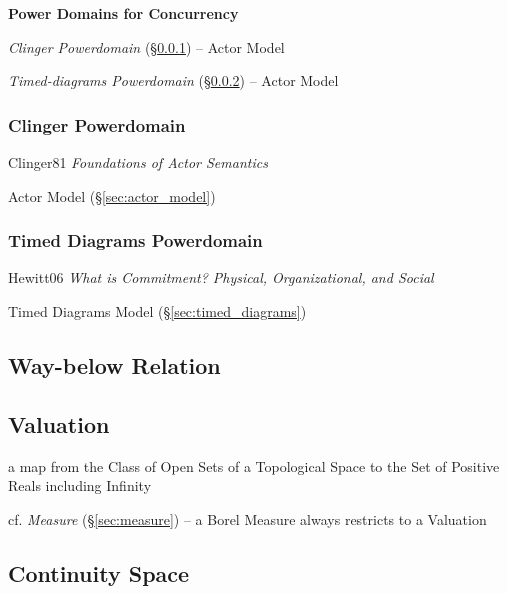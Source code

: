\textbf{Power Domains for Concurrency}

\emph{Clinger Powerdomain} (\S\ref{sec:clinger_powerdomain}) -- Actor
Model

\emph{Timed-diagrams Powerdomain}
(\S\ref{sec:timed_diagrams_powerdomain}) -- Actor Model



\subsubsection{Clinger Powerdomain}\label{sec:clinger_powerdomain}

Clinger81 \emph{Foundations of Actor Semantics}

\fist Actor Model (\S\ref{sec:actor_model})



\subsubsection{Timed Diagrams Powerdomain}
\label{sec:timed_diagrams_powerdomain}

Hewitt06 \emph{What is Commitment? Physical, Organizational, and
  Social}

\fist Timed Diagrams Model (\S\ref{sec:timed_diagrams})



\subsection{Way-below Relation}\label{sec:waybelow_relation}

\subsection{Valuation}\label{sec:domain_valuation}

a map from the Class of Open Sets of a Topological Space to the Set of Positive
Reals including Infinity

\fist cf. \emph{Measure} (\S\ref{sec:measure}) -- a Borel Measure
always restricts to a Valuation



\subsection{Continuity Space}\label{sec:continuity_space}
